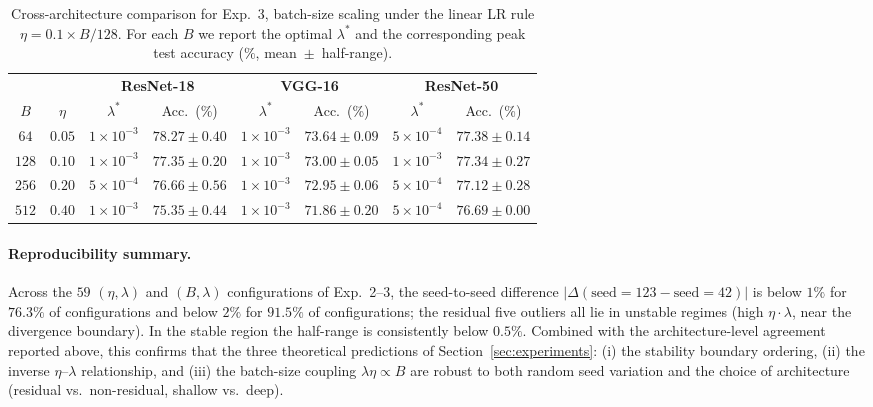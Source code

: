 \begin{table}[h]
\centering
\small
\caption{Cross-architecture comparison for Exp.~3, batch-size scaling under the linear LR rule $\eta=0.1\times B/128$. For each $B$ we report the optimal $\lambda^{*}$ and the corresponding peak test accuracy ($\%$, mean~$\pm$~half-range).}
\label{tab:robust-exp3}
\vspace{0.2em}
\begin{tabular}{c c c c c c c c}
\toprule
 & & \multicolumn{2}{c}{\textbf{ResNet-18}} & \multicolumn{2}{c}{\textbf{VGG-16}} & \multicolumn{2}{c}{\textbf{ResNet-50}} \\
\cmidrule(lr){3-4}\cmidrule(lr){5-6}\cmidrule(lr){7-8}
$B$ & $\eta$ & $\lambda^{*}$ & Acc.\ (\%) & $\lambda^{*}$ & Acc.\ (\%) & $\lambda^{*}$ & Acc.\ (\%) \\
\midrule
$64$  & $0.05$ & $1\!\times\!10^{-3}$ & $78.27 \pm 0.40$ & $1\!\times\!10^{-3}$ & $73.64 \pm 0.09$ & $5\!\times\!10^{-4}$ & $77.38 \pm 0.14$ \\
$128$ & $0.10$ & $1\!\times\!10^{-3}$ & $77.35 \pm 0.20$ & $1\!\times\!10^{-3}$ & $73.00 \pm 0.05$ & $1\!\times\!10^{-3}$ & $77.34 \pm 0.27$ \\
$256$ & $0.20$ & $5\!\times\!10^{-4}$ & $76.66 \pm 0.56$ & $1\!\times\!10^{-3}$ & $72.95 \pm 0.06$ & $5\!\times\!10^{-4}$ & $77.12 \pm 0.28$ \\
$512$ & $0.40$ & $1\!\times\!10^{-3}$ & $75.35 \pm 0.44$ & $1\!\times\!10^{-3}$ & $71.86 \pm 0.20$ & $5\!\times\!10^{-4}$ & $76.69 \pm 0.00$ \\
\bottomrule
\end{tabular}
\end{table}

\paragraph{Reproducibility summary.}
Across the $59$ $(\eta,\lambda)$ and $(B,\lambda)$ configurations of Exp.~2--3, the seed-to-seed difference $|\Delta(\text{seed}{=}123-\text{seed}{=}42)|$ is below $1\%$ for $76.3\%$ of configurations and below $2\%$ for $91.5\%$ of configurations; the residual five outliers all lie in unstable regimes (high $\eta\cdot\lambda$, near the divergence boundary). In the stable region the half-range is consistently below $0.5\%$. Combined with the architecture-level agreement reported above, this confirms that the three theoretical predictions of Section~\ref{sec:experiments}: (i) the stability boundary ordering, (ii) the inverse $\eta$--$\lambda$ relationship, and (iii) the batch-size coupling $\lambda\eta\propto B$ are robust to both random seed variation and the choice of architecture (residual vs.\ non-residual, shallow vs.\ deep).


